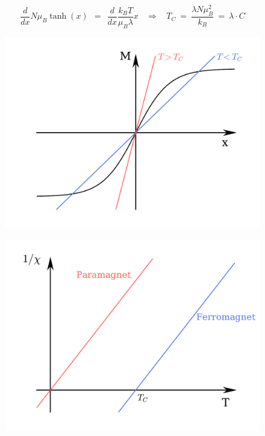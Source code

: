 \documentclass[10pt]{report}
\numberwithin{equation}{chapter}
\begin{document}
\begin{equation}
  \frac{d}{dx} N \mu_B \tanh(x) ~~ = ~~ \frac{d}{dx} \frac{k_BT}{\mu_B \lambda} x ~~~~ \Rightarrow ~~~~
  T_C ~=~\frac{\lambda N \mu_B^2}{k_B} ~=~ \lambda \cdot C
\end{equation}


\begin{figure}[t]
  \begin{minipage}[c][6.00cm]{.5\textwidth}
    \vspace*{\fill}
    \centering
    \includegraphics[width=0.916\linewidth]{../img/ferromag_graph_sol.pdf}
    \captionsetup{width=.95\linewidth}
    \label{fig:ferromag_graph_sol}
  \end{minipage}%
  \begin{minipage}[c][6.00cm]{.5\textwidth}
    \vspace*{\fill}
    \centering
    \includegraphics[width=0.95\linewidth]{../img/ferro_para_compar.pdf}
    \captionsetup{width=.95\linewidth}
  \end{minipage}
  
\end{figure}
\end{document}
